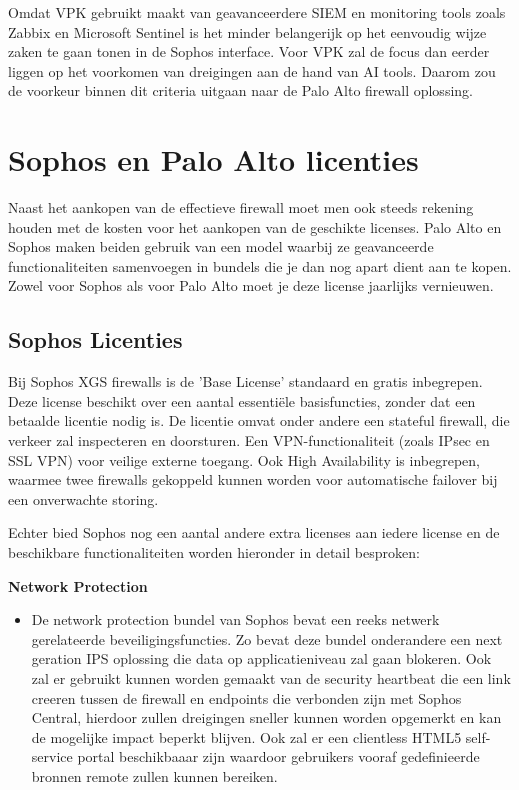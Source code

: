 Omdat VPK gebruikt maakt van geavanceerdere SIEM en monitoring tools zoals Zabbix en Microsoft Sentinel is het minder belangerijk op het eenvoudig wijze zaken te gaan tonen in de Sophos interface. Voor VPK zal de focus dan eerder liggen op het voorkomen van dreigingen aan de hand van AI tools. Daarom zou de voorkeur binnen dit criteria uitgaan naar de Palo Alto firewall oplossing.





\section{Sophos en Palo Alto licenties}
Naast het aankopen van de effectieve firewall moet men ook steeds rekening houden met de kosten voor het aankopen van de geschikte licenses. Palo Alto en Sophos maken beiden gebruik van een model waarbij ze
geavanceerde functionaliteiten samenvoegen in bundels die je dan nog apart dient aan te kopen. Zowel voor Sophos als voor Palo Alto moet je deze license jaarlijks vernieuwen.


\subsection{Sophos Licenties}
Bij Sophos XGS firewalls is de 'Base License' standaard en gratis inbegrepen. Deze license beschikt over een aantal essentiële basisfuncties, zonder dat een betaalde licentie nodig is. De licentie omvat onder andere een stateful firewall, die verkeer zal inspecteren en doorsturen. Een VPN-functionaliteit (zoals IPsec en SSL VPN) voor veilige externe toegang. Ook High Availability is inbegrepen, waarmee twee firewalls gekoppeld kunnen worden voor automatische failover bij een onverwachte storing.

Echter bied Sophos nog een aantal andere extra licenses aan iedere license en de beschikbare functionaliteiten worden hieronder in detail besproken:

\textbf{Network Protection}
\begin{itemize}[label=\textbullet]
    \item De network protection bundel van Sophos bevat een reeks netwerk gerelateerde beveiligingsfuncties. Zo bevat deze bundel onderandere een next geration IPS oplossing die data op applicatieniveau zal gaan blokeren. Ook zal er gebruikt kunnen worden gemaakt van de security heartbeat die een link creeren tussen de firewall en endpoints die verbonden zijn met Sophos Central, hierdoor zullen dreigingen sneller kunnen worden opgemerkt en kan de mogelijke impact beperkt blijven. Ook zal er een clientless HTML5 self-service portal beschikbaaar zijn waardoor gebruikers vooraf gedefinieerde bronnen remote zullen kunnen bereiken.
\end{itemize}


